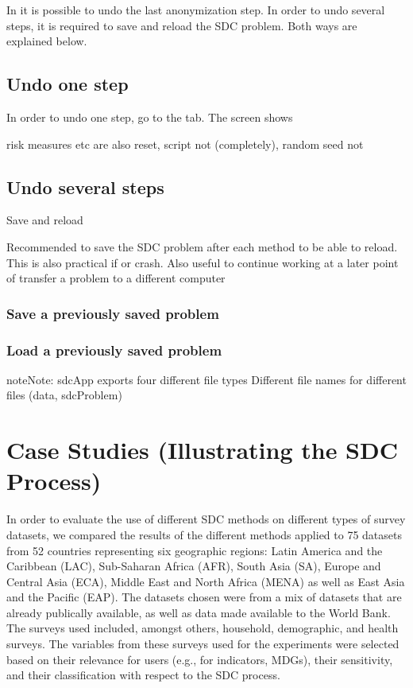 \documentclass[letterpaper,10pt,english]{sphinxmanual}
\begin{document}
In  it is possible to undo the last anonymization step. In order to undo several
steps, it is required to save and reload the SDC problem. Both ways are explained below.


\section{Undo one step}
\label{\detokenize{undo:undo-one-step}}
In order to undo one step, go to the  tab.
The screen shows

risk measures etc are also reset, script not (completely), random seed not


\section{Undo several steps}
\label{\detokenize{undo:undo-several-steps}}
Save and reload

Recommended to save the SDC problem after each method to be able to reload. This is also
practical if  or  crash. Also useful to continue working at a later point of
transfer a problem to a different computer


\subsection{Save a previously saved problem}
\label{\detokenize{undo:save-a-previously-saved-problem}}

\subsection{Load a previously saved problem}
\label{\detokenize{undo:load-a-previously-saved-problem}}
\begin{sphinxadmonition}{note}{Note:}
sdcApp exports four different file types
Different file names for different files (data, sdcProblem)
\end{sphinxadmonition}


\chapter{Case Studies (Illustrating the SDC Process)}
\label{\detokenize{casestudies::doc}}\label{\detokenize{casestudies:case-studies-illustrating-the-sdc-process}}
In order to evaluate the use of different SDC methods on different types
of survey datasets, we compared the results of the different methods
applied to 75 datasets from 52 countries representing six geographic
regions: Latin America and the Caribbean (LAC), Sub-Saharan Africa
(AFR), South Asia (SA), Europe and Central Asia (ECA), Middle East and
North Africa (MENA) as well as East Asia and the Pacific (EAP). The
datasets chosen were from a mix of datasets that are already publically
available, as well as data made available to the World Bank.
The surveys used included, amongst others, household,
demographic, and health surveys. The variables from these surveys used
for the experiments were selected based on their relevance for users
(e.g., for indicators, MDGs), their sensitivity, and their classification
with respect to the SDC process.
\end{document}
